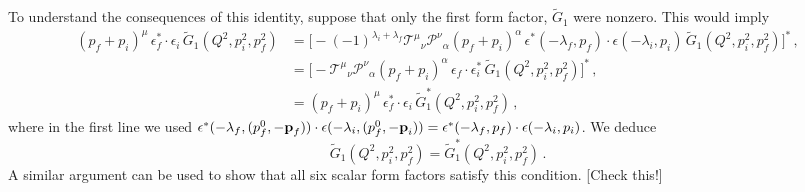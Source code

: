 {To understand the consequences of this identity, suppose that only the first form factor, $\widetilde G_1$ were nonzero. This would imply
\begin{align}
(p_f+p_i)^\mu \,\epsilon_f^*  \cdot \epsilon_i \, \widetilde{G}_1(Q^2,p_i^2,p_f^2) & = \Big [ - (-1)^{\lambda_i+\lambda_f}  \mathcal {T^{\mu}}_\nu  \mathcal {P^{\nu}}_\alpha  (p_f+p_i)^\alpha \,\epsilon^*(- \lambda_f,  p_f) \cdot \epsilon(- \lambda_i,   p_i) \, \widetilde{G}_1(Q^2,p_i^2,p_f^2) \Big ]^* \,, \\
& =  \Big [ -    \mathcal {T^{\mu}}_\nu  \mathcal {P^{\nu}}_\alpha  (p_f+p_i)^\alpha \,\epsilon_f \cdot \epsilon^*_i \, \widetilde{G}_1(Q^2,p_i^2,p_f^2) \Big ]^* \,, \\
& =     (p_f+p_i)^\mu \,\epsilon^*_f \cdot \epsilon_i \, \widetilde{G}^*_1(Q^2,p_i^2,p_f^2)  \,,
\end{align}
where in the first line we used $\epsilon^*(- \lambda_f,  (p^0_f, - \textbf p_f)) \cdot \epsilon(- \lambda_i,   (p^0_f, - \textbf p_i)) = \epsilon^*(- \lambda_f,  p_f) \cdot \epsilon(- \lambda_i,   p_i)$. We deduce
\begin{equation}
\widetilde{G}_1(Q^2,p_i^2,p_f^2)  = \widetilde{G}^*_1(Q^2,p_i^2,p_f^2) \,.
\end{equation}
A similar argument can be used to show that all six scalar form factors satisfy this condition. [Check this!]

\bigskip
}




